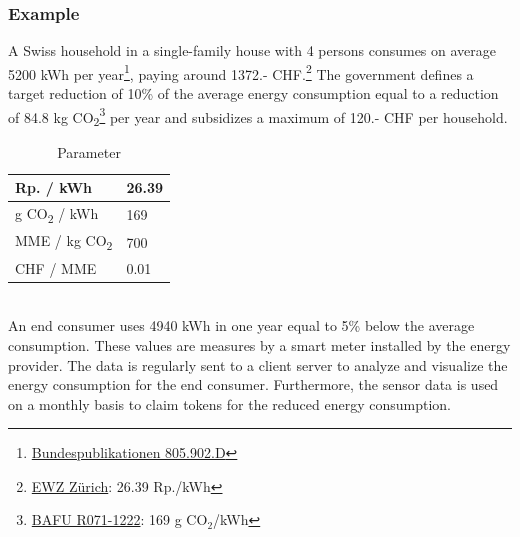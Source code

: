 \documentclass[11pt]{article}
\begin{document}
\subsubsection{Example}
A Swiss household in a single-family house with 4 persons consumes on average 5200 kWh per year\footnote{\href{https://www.bundespublikationen.admin.ch/cshop_mimes_bbl/2C/2C59E545D7371ED5BB89418480F1B62D.pdf}{Bundespublikationen 805.902.D}}, paying around 1372.- CHF.\footnote{\href{https://www.ewz.ch/content/dam/ewz/services/dokumentencenter/energie-beziehen/dokumente/gruener-strom-fuer-mein-zuhause/stromtarif-2018-zh-private.pdf}{EWZ Zürich}: 26.39 Rp./kWh} The government defines a target reduction of 10\% of the average energy consumption equal to a reduction of 84.8 kg CO\textsubscript{2}\footnote{\href{https://www.bafu.admin.ch/bafu/de/home/suche.html\#R071-1222}{BAFU R071-1222}: 169 g CO$_2$/kWh} per year and subsidizes a maximum of 120.- CHF per household.
\begin{table}[h]
\begin{center}
\begin{tabular}{ll}
Rp. / kWh & 26.39 \\ \hline
g CO\textsubscript{2} / kWh                                                                                                                               & 169 \\ \hline
MME / kg CO\textsubscript{2}                                                                                                                                   & 700  \\ \hline
CHF / MME                                                                                                                                       & 0.01
\end{tabular}
\caption{Parameter}
\label{table_parameter}
\end{center}
\end{table}
\\
An end consumer uses 4940 kWh in one year equal to 5\% below the average consumption. These values are measures by a smart meter installed by the energy provider. The data is regularly sent to a client server to analyze and visualize the energy consumption for the end consumer. Furthermore, the sensor data is used on a monthly basis to claim tokens for the reduced energy consumption.
\end{document}
